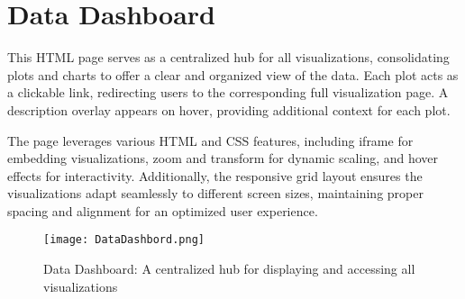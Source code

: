 \section{Data Dashboard}
This HTML page serves as a centralized hub for all visualizations, consolidating plots and charts to offer a clear and organized view of the data. Each plot acts as a clickable link, redirecting users to the corresponding full visualization page. A description overlay appears on hover, providing additional context for each plot.

The page leverages various HTML and CSS features, including iframe for embedding visualizations, zoom and transform for dynamic scaling, and hover effects for interactivity. Additionally, the responsive grid layout ensures the visualizations adapt seamlessly to different screen sizes, maintaining proper spacing and alignment for an optimized user experience.

\begin{figure}[ht]
    \centering
    \texttt{[image: DataDashbord.png]}
    \caption{Data Dashboard: A centralized hub for displaying and accessing all visualizations}
    \label{fig:choropleth_map}
\end{figure}
